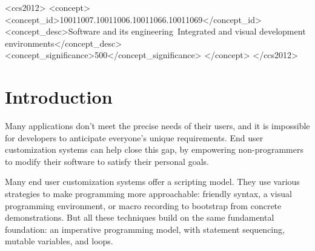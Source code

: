 \documentclass[sigplan,screen,10pt,anonymous,review]{acmart}
\begin{document}
\begin{CCSXML}
<ccs2012>
<concept>
<concept_id>10011007.10011006.10011066.10011069</concept_id>
<concept_desc>Software and its engineering~Integrated and visual development environments</concept_desc>
<concept_significance>500</concept_significance>
</concept>
</ccs2012>
\end{CCSXML}




\maketitle

\hypertarget{introduction}{%
\section{Introduction}\label{introduction}}

Many applications don't meet the precise needs of their users, and it is
impossible for developers to anticipate everyone's unique requirements.
End user customization systems can help close this gap, by empowering
non-programmers to modify their software to satisfy their personal
goals.

Many end user customization systems
\citep{cook2007, bolin2005, leshed2008, chasins2018} offer a scripting
model. They use various strategies to make programming more
approachable: friendly syntax, a visual programming environment, or
macro recording to bootstrap from concrete demonstrations. But all these
techniques build on the same fundamental foundation: an imperative
programming model, with statement sequencing, mutable variables, and
loops.
\end{document}

